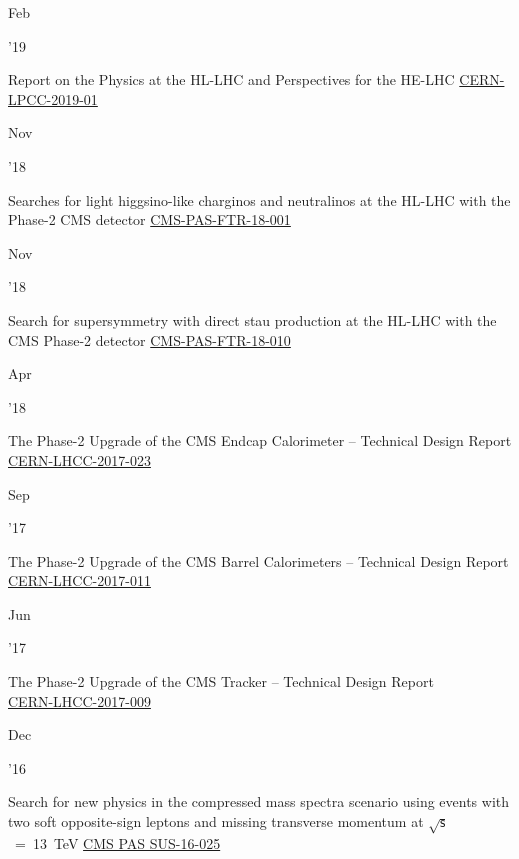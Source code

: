 \documentclass[]{cv} %
\begin{document}
\begin{entrylist}

  \entrytwo
  {\parbox[t]{\parboxWidthOne}{Feb}\parbox[t]{\parboxWidthTwo}{\hfill '19}}
  {Report on the Physics at the HL-LHC and Perspectives for the HE-LHC}
  {\href{https://arxiv.org/abs/1902.10229}{CERN-LPCC-2019-01}}
  {\vspace*{\spacingPubs}}

  \entry
  {\parbox[t]{\parboxWidthOne}{Nov}\parbox[t]{\parboxWidthTwo}{\hfill '18}}
  {Searches for light higgsino-like charginos and neutralinos at the HL-LHC with
  the Phase-2 CMS detector}
  {\href{https://cds.cern.ch/record/2648538}{CMS-PAS-FTR-18-001}}
  {\vspace*{\spacingPubs}}

  \entry
  {\parbox[t]{\parboxWidthOne}{Nov}\parbox[t]{\parboxWidthTwo}{\hfill '18}}
  {Search for supersymmetry with direct stau production at the HL-LHC with the
  CMS Phase-2 detector}
  {\href{https://cds.cern.ch/record/2647985}{CMS-PAS-FTR-18-010}}
  {\vspace*{\spacingPubs}}

  \entry
  {\parbox[t]{\parboxWidthOne}{Apr}\parbox[t]{\parboxWidthTwo}{\hfill '18}}
  {The Phase-2 Upgrade of the CMS Endcap Calorimeter -- Technical Design Report}
  {\href{https://cds.cern.ch/record/2293646}{CERN-LHCC-2017-023}}
  {\vspace*{\spacingPubs}}

  \entry
  {\parbox[t]{\parboxWidthOne}{Sep}\parbox[t]{\parboxWidthTwo}{\hfill '17}}
  {The Phase-2 Upgrade of the CMS Barrel Calorimeters -- Technical Design Report}
  {\href{https://cds.cern.ch/record/2283187}{CERN-LHCC-2017-011}}
  {\vspace*{\spacingPubs}}

  \entry
  {\parbox[t]{\parboxWidthOne}{Jun}\parbox[t]{\parboxWidthTwo}{\hfill '17}}
  {The Phase-2 Upgrade of the CMS Tracker -- Technical Design Report\\}
  {\href{https://cds.cern.ch/record/2272264}{CERN-LHCC-2017-009}}
  {\vspace*{\spacingPubs}}

  \entry
  {\parbox[t]{\parboxWidthOne}{Dec}\parbox[t]{\parboxWidthTwo}{\hfill '16}}
  {Search for new physics in the compressed mass spectra scenario using events with two soft opposite-sign leptons and missing transverse momentum at $\sqrt{\mathsf{s}}$~=~13~TeV}
  {\href{https://cds.cern.ch/record/2205866}{CMS PAS SUS-16-025}}
  {\vspace*{\spacingPubs}}


\end{entrylist}
\end{document}
